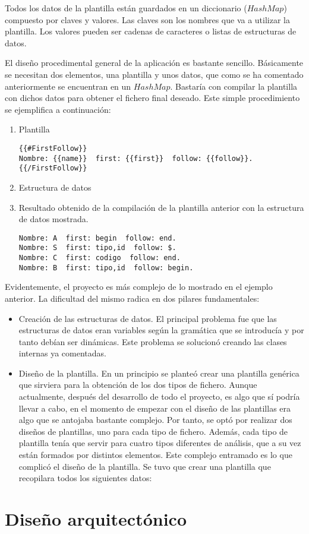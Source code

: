 Todos los datos de la plantilla están guardados en un diccionario ($HashMap$) compuesto por claves y valores. Las claves son los nombres que va a utilizar la plantilla.
Los valores pueden ser cadenas de caracteres o listas de estructuras de datos.

El diseño procedimental general de la aplicación es bastante sencillo. Básicamente se necesitan dos elementos, una plantilla y unos datos, que como se ha comentado anteriormente se encuentran en un $HashMap$. Bastaría con compilar la plantilla con dichos datos para obtener el fichero final deseado. Este simple procedimiento se ejemplifica a continuación:

\begin{enumerate}
\item Plantilla
\begin{verbatim}
{{#FirstFollow}}
Nombre: {{name}}  first: {{first}}  follow: {{follow}}.
{{/FirstFollow}}
\end{verbatim}
\item Estructura de datos
\item Resultado obtenido de la compilación de la plantilla anterior con la estructura de datos mostrada.
\begin{verbatim}
Nombre: A  first: begin  follow: end.
Nombre: S  first: tipo,id  follow: $.
Nombre: C  first: codigo  follow: end.
Nombre: B  first: tipo,id  follow: begin.
\end{verbatim}
\end{enumerate}

Evidentemente, el proyecto es más complejo de lo mostrado en el ejemplo anterior. La dificultad del mismo radica en dos pilares fundamentales:

\begin{itemize}
\item Creación de las estructuras de datos. El principal problema fue que las estructuras de datos eran variables según la gramática que se introducía y por tanto debían ser dinámicas. Este problema se solucionó creando las clases internas ya comentadas.
\item Diseño de la plantilla. En un principio se planteó crear una plantilla genérica que sirviera para la obtención de los dos tipos de fichero. Aunque actualmente, después del desarrollo de todo el proyecto, es algo que sí podría llevar a cabo, en el momento de empezar con el diseño de las plantillas era algo que se antojaba bastante complejo. Por tanto, se optó por realizar dos diseños de plantillas, uno para cada tipo de fichero. Además, cada tipo de plantilla tenía que servir para cuatro tipos diferentes de análisis, que a su vez están formados por distintos elementos. Este complejo entramado es lo que complicó el diseño de la plantilla. Se tuvo que crear una plantilla que recopilara todos los siguientes datos:

\end{itemize} 

\section{Diseño arquitectónico}


